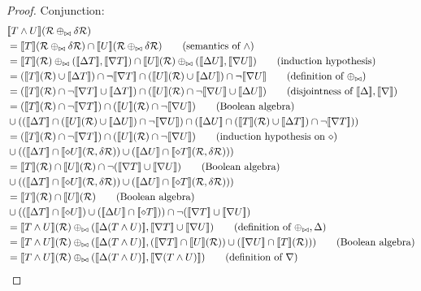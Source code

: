 \begin{proof}
  Conjunction:
  \begin{align*}
    &\sem{T \wedge U}(\semR \twist \diffR)\\
    &= \sem{T}(\semR \twist \diffR) \cap \sem{U}(\semR \twist \diffR) \tag{semantics of $\wedge$}\\
    &= \sem{T}(\semR) \twist (\upsem{T}, \downsem{T}) 
      \cap \sem{U}(\semR) \twist (\upsem{U}, \downsem{U}) \tag{induction hypothesis}\\
    &= (\sem{T}(\semR) \cup \upsem{T}) \cap \neg \downsem{T} 
      \cap (\sem{U}(\semR) \cup \upsem{U}) \cap \neg \downsem{U} \tag{definition of $\twist$}\\
    &= (\sem{T}(\semR) \cap \neg \downsem{T} \cup \upsem{T})
      \cap (\sem{U}(\semR) \cap \neg \downsem{U} \cup \upsem{U}) \tag{disjointness of $\upsem{}, \downsem{}$}\\
    &= (\sem{T}(\semR) \cap \neg \downsem{T}) \cap (\sem{U}(\semR) \cap \neg \downsem{U}) \tag{Boolean algebra}\\
    & \cup ((\upsem{T} \cap (\sem{U}(\semR) \cup \upsem{U}) \cap \neg \downsem{U})
      \cap (\upsem{U} \cap (\sem{T}(\semR) \cup \upsem{T}) \cap \neg \downsem{T}))\\
    &= (\sem{T}(\semR) \cap \neg \downsem{T}) \cap (\sem{U}(\semR) \cap \neg \downsem{U}) \tag{induction hypothesis on $\bothdiff$}\\
    & \cup ((\upsem{T} \cap \bothsem{U}(\semR, \diffR))
            \cup (\upsem{U} \cap \bothsem{T}(\semR, \diffR)))\\
    &= \sem{T}(\semR) \cap \sem{U}(\semR) \cap \neg (\downsem{T} \cup \downsem{U}) \tag{Boolean algebra}\\
      &\cup ((\upsem{T} \cap \bothsem{U}(\semR, \diffR))
            \cup (\upsem{U} \cap \bothsem{T}(\semR, \diffR)))\\
    &= \sem{T}(\semR) \cap \sem{U}(\semR) \tag{Boolean algebra}\\
    & \cup ((\upsem{T} \cap \bothsem{U})
            \cup (\upsem{U} \cap \bothsem{T}))
      \cap \neg (\downsem{T} \cup \downsem{U})\\
    &= \sem{T \wedge U}(\semR)
      \twist (\upsem{(T \wedge U)}, \downsem{T} \cup \downsem{U}) \tag{definition of $\twist, \updiff$}\\
    &= \sem{T \wedge U}(\semR)
      \twist (\upsem{(T \wedge U)}, 
      (\downsem{T} \cap \sem{U}(\semR)) \cup (\downsem{U} \cap \sem{T}(\semR))) \tag{Boolean algebra}\\
    &= \sem{T \wedge U}(\semR)
      \twist (\upsem{(T \wedge U)}, \downsem{(T \wedge U)}) \tag{definition of $\downdiff{}$}
  \end{align*}
  

\end{proof}
